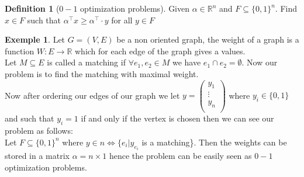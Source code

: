 \documentclass[a4paper,11pt,american]{article}
\newcommand{\R}{\mathbb{R}}
\theoremstyle{plain}
\theoremstyle{definition}
\newtheorem{definition}{Definition}
\newtheorem{example}{Exemple}
\begin{document}
\begin{definition}[$0-1$ optimization problems]
 Given $\alpha\in\R^n$ and $F\subseteq\{0,1\}^n$. Find $x\in F$ such that $\alpha^\top x\geq \alpha^\top \cdot y$ for all $y\in F$
\end{definition}
\begin{example}
    Let $G=(V,E)$ be a non oriented graph, the weight of a graph is a function $W:E\rightarrow \R$ which for each edge of the graph gives a values.\\
    Let $M\subseteq E$ is called a matching if $\forall e_1,e_2\in M$ we have $e_1\cap e_2=\emptyset$.
    Now our problem is to find the matching with maximal weight.\\
    Now after ordering our edges of our graph we let $y=\begin{pmatrix}
        y_1\\
        \vdots\\
        y_n\\
    \end{pmatrix}$ where $y_i\in \{0,1\}$ and such that $y_i=1$ if and only if the vertex is chosen then we can see our problem as follows: \\
    Let $F\subseteq \{0,1\}^n$ where $y\in n\iff \{e_i \vert y_{e_i}$ is a matching\}. Then the weights can be stored in a matrix $\alpha=n\times 1$ hence the problem can be easily seen as $0-1$ optimization problems.
\end{example}
\end{document}
